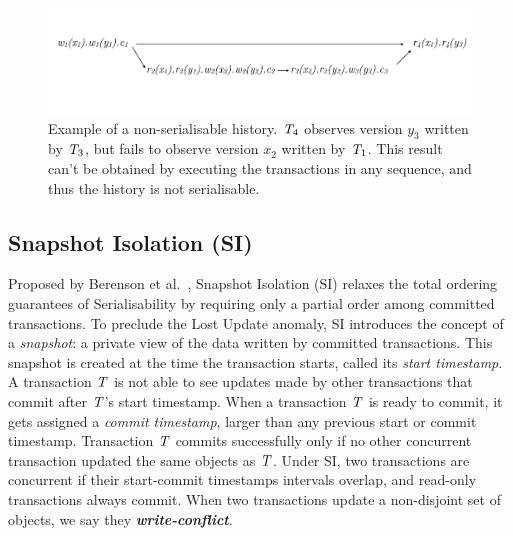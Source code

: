 \begin{figure}[h]
  \centering
  \vspace{-1cm}
  \includegraphics[width=\textwidth]{figures/non_ser_hist.pdf}
  \vspace{-1cm}
  \caption{Example of a non-serialisable history. $\mathit{T}_4$ observes version $y_3$ written by $\mathit{T}_3$, but fails to observe version $x_2$ written by $\mathit{T}_1$. This result can't be obtained by executing the transactions in any sequence, and thus the history is not serialisable.}
  \label{fig:non_ser_history}
\end{figure}


\subsection{Snapshot Isolation (SI)}
\label{sect:si}

Proposed by Berenson et al.~\citep{sql-critique}, Snapshot Isolation (SI) relaxes the total ordering guarantees of Serialisability by requiring only a partial order among committed transactions. To preclude the Lost Update anomaly, SI introduces the concept of a \emph{snapshot}: a private view of the data written by committed transactions. This snapshot is created at the time the transaction starts, called its \emph{start timestamp}. A transaction $\mathit{T}$ is not able to see updates made by other transactions that commit after $\mathit{T}$'s start timestamp. When a transaction $\mathit{T}$ is ready to commit, it gets assigned a \emph{commit timestamp}, larger than any previous start or commit timestamp. Transaction $\mathit{T}$ commits successfully only if no other concurrent transaction updated the same objects as $\mathit{T}$. Under SI, two transactions are concurrent if their start-commit timestamps intervals overlap, and read-only transactions always commit. When two transactions update a non-disjoint set of objects, we say they \textbf{\em write-conflict}.

